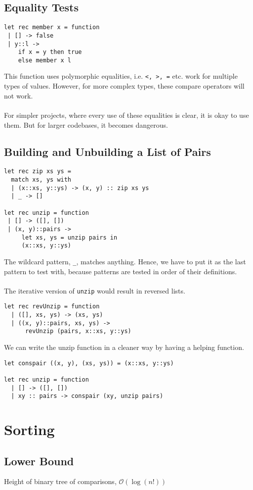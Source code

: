 \documentclass[12pt,a4paper]{article} %
\begin{document}
\subsection{Equality Tests}
\begin{lstlisting}[language=caml]
let rec member x = function
 | [] -> false
 | y::l ->
    if x = y then true
    else member x l
\end{lstlisting}
This function uses polymorphic equalities, i.e. \verb|<, >, =| etc. work for multiple types of values. However, for more complex types, these compare operators will not work.
\\\\
For simpler projects, where every use of these equalities is clear, it is okay to use them. But for larger codebases, it becomes dangerous.
\subsection{Building and Unbuilding a List of Pairs}
\begin{lstlisting}[language=caml]
let rec zip xs ys =
  match xs, ys with
  | (x::xs, y::ys) -> (x, y) :: zip xs ys
  | _ -> []
  
let rec unzip = function
 | [] -> ([], [])
 | (x, y)::pairs ->
     let xs, ys = unzip pairs in
     (x::xs, y::ys)
\end{lstlisting}
The wildcard pattern, \verb|_|, matches anything. Hence, we have to put it as the last pattern to test with, because patterns are tested in order of their definitions.
\\\\
The iterative version of \verb|unzip| would result in reversed lists.
\begin{lstlisting}[language=caml]
let rec revUnzip = function
  | ([], xs, ys) -> (xs, ys)
  | ((x, y)::pairs, xs, ys) ->
      revUnzip (pairs, x::xs, y::ys)
\end{lstlisting}
We can write the unzip function in a cleaner way by having a helping function.
\begin{lstlisting}[language=caml]
let conspair ((x, y), (xs, ys)) = (x::xs, y::ys)

let rec unzip = function
  | [] -> ([], [])
  | xy :: pairs -> conspair (xy, unzip pairs)
\end{lstlisting}
\section{Sorting}
\subsection{Lower Bound}
Height of binary tree of comparisons, $\mathcal{O}(\log(n!))$
\end{document}
